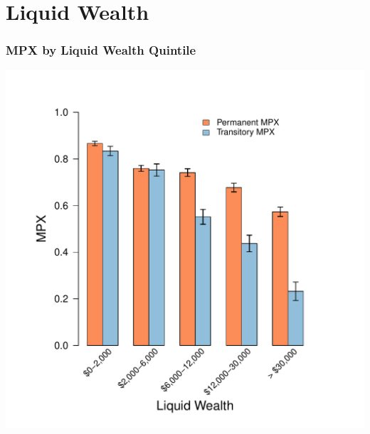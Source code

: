 \documentclass{beamer}
\begin{document}
\section{Liquid Wealth}
\frame
{
	\frametitle{MPX by Liquid Wealth Quintile}
	\label{MPXbyLiquidWealth}
	\centering
		\includegraphics[scale=0.5, trim=1.3cm 0 0 1.3cm]{../Figures/MPXByLiquidWealth_level_lincome_head_CFPBslides.pdf}
}
\end{document}
